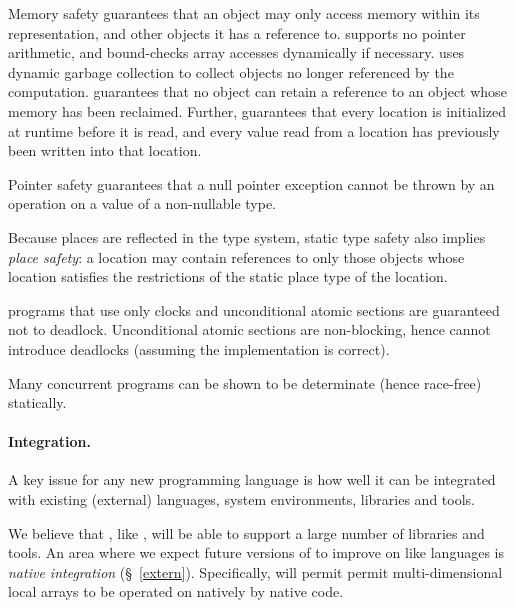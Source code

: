 Memory safety guarantees that an object may only access memory within
its representation, and other objects it has a reference to. \Xten{}
supports no pointer arithmetic, and bound-checks array accesses
dynamically if necessary. \Xten{} uses dynamic garbage collection to
collect objects no longer referenced by the computation. \Xten{}
guarantees that no object can retain a reference to an object
whose memory has been reclaimed.  Further, \Xten{} guarantees that
every location is initialized at runtime before it is read, 
and every value read from a location has previously been written into
that location. 

Pointer safety guarantees that a null pointer exception cannot be
thrown by an operation on a value of a non-nullable type.

Because places are reflected in the type system, static type safety
also implies {\em place safety}: a location may contain references to only
those objects whose location satisfies the restrictions of the static
place type of the location.

\Xten{} programs that use only clocks and unconditional atomic
sections are guaranteed not to deadlock. Unconditional atomic sections
are non-blocking, hence cannot introduce deadlocks (assuming the
implementation is correct).

Many concurrent programs can be shown to be determinate (hence
race-free) statically.

\paragraph{Integration.}
A key issue for any new programming language is how well it can be
integrated with existing (external) languages, system environments,
libraries and tools.

We believe that \Xten{}, like \java{}, will be able to support a large
number of libraries and tools. An area where we expect future versions
of \Xten{} to improve on \java{} like languages is {\em native
integration} (\S~\ref{extern}). Specifically, \Xten{} will permit
permit multi-dimensional local arrays to be operated on natively by
native code.

